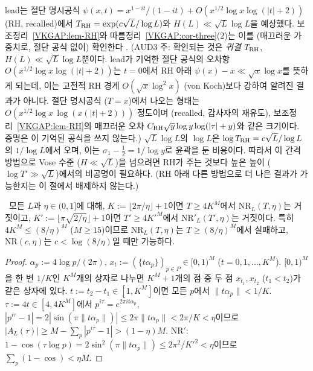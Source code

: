\begin{remark}\label{VKGAP:rem-RH-check}
lead는 절단 명시공식 $\psi(x,t)=x^{1-it}/(1-it)+O(x^{1/2}\log x\log(|t|+2))$ (RH, recalled)에서 $T_{\rm RH}=\exp(c\sqrt L/\log L)$와
$H(L)\ll\sqrt L\log L$을 예상했다. 보조정리~\ref{VKGAP:lem-RH}와 따름정리~\ref{VKGAP:cor-three}(2)는 이를 (매끄러운 가중치로, 절단 공식 없이) 확인한다 .
(AUD3 주: 확인되는 것은 \emph{귀결} $T_{\rm RH}$, $H(L)\ll\sqrt L\log L$뿐이다. lead가 기억한 절단 공식의 오차항
$O(x^{1/2}\log x\log(|t|+2))$는 $t=0$에서 RH 아래 $\psi(x)-x\ll\sqrt x\log x$를 뜻하게 되는데, 이는 고전적 RH 경계
$O(\sqrt x\log^2x)$ (von Koch)보다 강하여 알려진 결과가 아니다. 절단 명시공식 ($T=x$)에서 나오는 형태는 $O(x^{1/2}\log x\,\log(x(|t|+2)))$ 정도이며 (recalled, 감사자의 재유도),
보조정리~\ref{VKGAP:lem-RH}의 매끄러운 오차 $C_{\rm RH}\sqrt y\log y\log(|\tau|+y)$와 같은 크기이다. 증명은 이 기억된 공식을 쓰지 않는다.)
$\sqrt L\log L$의 $\log L$은 $\log T_{\rm RH}=c\sqrt L/\log L$의 $1/\log L$에서 오며, 이는 $\sigma_1-\frac12=1/\log y$로 윤곽을 둔 비용이다.
\HEUR{} 따라서 이 간격 방법으로 Vose 수준 ($H\ll\sqrt L$)을 넘으려면 RH가 주는 것보다 높은 높이 ($\log T'\gg\sqrt L$)에서의 비공명이 필요하다.
(RH 아래 다른 방법으로 더 나은 결과가 가능한지는 이 절에서 배제하지 않는다.)
\end{remark}

\begin{proposition}\label{VKGAP:prop-dirichlet}
\PROVED\ 모든 $L$과 $\eta\in(0,1]$에 대해, $K:=\lfloor2\pi/\eta\rfloor+1$이면 $T\ge4K^M$에서 $\mathrm{NR}_L(T,\eta)$는 거짓이고,
$K':=\lfloor\pi\sqrt{2/\eta}\rfloor+1$이면 $T'\ge4K'^M$에서 $\mathrm{NR}'_L(T',\eta)$는 거짓이다.
특히 $4K^M\le(8/\eta)^M$ ($M\ge15$)이므로 $\mathrm{NR}_L(T,\eta)$는 $T\ge(8/\eta)^M$에서 실패하고, $\mathrm{NR}(c,\eta)$는 $c<\log(8/\eta)$일 때만 가능하다.
\end{proposition}
\begin{proof}
$\alpha_p:=4\log p/(2\pi)$, $x_t:=(\{t\alpha_p\})_{p\in P}\in[0,1)^M$ ($t=0,1,\dots,K^M$). $[0,1)^M$을 한 변 $1/K$인 $K^M$개의 상자로 나누면
$K^M+1$개의 점 중 두 점 $x_{t_1},x_{t_2}$ ($t_1<t_2$)가 같은 상자에 있다. $t:=t_2-t_1\in[1,K^M]$이면 모든 $p$에서 $\|t\alpha_p\|<1/K$.
$\tau:=4t\in[4,4K^M]$에서 $p^{i\tau}=e^{2\pi it\alpha_p}$, $|p^{i\tau}-1|=2|\sin(\pi\|t\alpha_p\|)|\le2\pi\|t\alpha_p\|<2\pi/K<\eta$이므로
$|A_L(\tau)|\ge M-\sum_p|p^{i\tau}-1|>(1-\eta)M$. $\mathrm{NR}'$: $1-\cos(\tau\log p)=2\sin^2(\pi\|t\alpha_p\|)\le2\pi^2/K'^2<\eta$이므로 $\sum_p(1-\cos)<\eta M$.
\end{proof}

